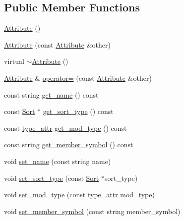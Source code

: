 \subsection*{Public Member Functions}
\begin{DoxyCompactItemize}
\item 
\hyperlink{classgenevalmag_1_1Attribute_aac01d62e0d5fc5448b03be75e8f74248}{Attribute} ()
\item 
\hyperlink{classgenevalmag_1_1Attribute_a6f7d7f355ad08b739593f77fc782a731}{Attribute} (const \hyperlink{classgenevalmag_1_1Attribute}{Attribute} \&other)
\item 
virtual \hyperlink{classgenevalmag_1_1Attribute_a00058e8a31423fe3d2d2a2127090eba0}{$\sim$Attribute} ()
\item 
\hyperlink{classgenevalmag_1_1Attribute}{Attribute} \& \hyperlink{classgenevalmag_1_1Attribute_aac5ff69cd1074e47a7794db8c65bff42}{operator=} (const \hyperlink{classgenevalmag_1_1Attribute}{Attribute} \&other)
\item 
const string \hyperlink{classgenevalmag_1_1Attribute_ac44b53232e4656b7e734bcbb942bddfe}{get\_\-name} () const 
\item 
const \hyperlink{classgenevalmag_1_1Sort}{Sort} $\ast$ \hyperlink{classgenevalmag_1_1Attribute_a5e04e4baa950b3c80ecbab0bf9cc56da}{get\_\-sort\_\-type} () const 
\item 
const \hyperlink{namespacegenevalmag_a0ae71e3da3851df63075a93820da40af}{type\_\-attr} \hyperlink{classgenevalmag_1_1Attribute_a365a6121af9f7c698cecfc930568afc1}{get\_\-mod\_\-type} () const 
\item 
const string \hyperlink{classgenevalmag_1_1Attribute_a5ff83a32a045e22648ff4c1ecff37c6b}{get\_\-member\_\-symbol} () const 
\item 
void \hyperlink{classgenevalmag_1_1Attribute_a295fa8b9fd96ca034adb8acd0c89b7ce}{set\_\-name} (const string name)
\item 
void \hyperlink{classgenevalmag_1_1Attribute_a871202067081b9fa79e53c870fb9c3d2}{set\_\-sort\_\-type} (const \hyperlink{classgenevalmag_1_1Sort}{Sort} $\ast$sort\_\-type)
\item 
void \hyperlink{classgenevalmag_1_1Attribute_a5145c88f9e2e6e797996e6a31a2492fb}{set\_\-mod\_\-type} (const \hyperlink{namespacegenevalmag_a0ae71e3da3851df63075a93820da40af}{type\_\-attr} mod\_\-type)
\item 
void \hyperlink{classgenevalmag_1_1Attribute_a72b9d591826fcd33079edab94855c312}{set\_\-member\_\-symbol} (const string member\_\-symbol)
\item 

\end{DoxyCompactItemize}
